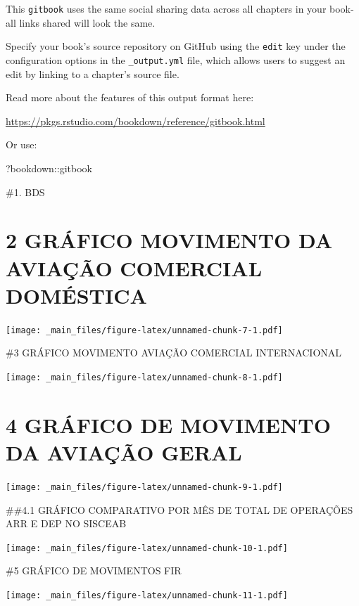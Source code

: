 \documentclass[
]{book}
\newenvironment{Shaded}{\begin{snugshade}}{\end{snugshade}}
\newcommand{\NormalTok}[1]{#1}
\newcommand{\SpecialCharTok}[1]{\textcolor[rgb]{0.00,0.00,0.00}{#1}}
\theoremstyle{definition}
\theoremstyle{definition}
\theoremstyle{definition}
\theoremstyle{definition}
\theoremstyle{remark}
\begin{document}
This \texttt{gitbook} uses the same social sharing data across all chapters in your book- all links shared will look the same.

Specify your book's source repository on GitHub using the \texttt{edit} key under the configuration options in the \texttt{\_output.yml} file, which allows users to suggest an edit by linking to a chapter's source file.

Read more about the features of this output format here:

\url{https://pkgs.rstudio.com/bookdown/reference/gitbook.html}

Or use:

\begin{Shaded}
\begin{Highlighting}[]
\NormalTok{?bookdown}\SpecialCharTok{::}\NormalTok{gitbook}
\end{Highlighting}
\end{Shaded}

\#1. BDS

\hypertarget{gruxe1fico-movimento-da-aviauxe7uxe3o-comercial-domuxe9stica}{%
\chapter{2 GRÁFICO MOVIMENTO DA AVIAÇÃO COMERCIAL DOMÉSTICA}\label{gruxe1fico-movimento-da-aviauxe7uxe3o-comercial-domuxe9stica}}

\texttt{[image: \_main\_files/figure-latex/unnamed-chunk-7-1.pdf]}

\#3 GRÁFICO MOVIMENTO AVIAÇÃO COMERCIAL INTERNACIONAL

\texttt{[image: \_main\_files/figure-latex/unnamed-chunk-8-1.pdf]}

\hypertarget{gruxe1fico-de-movimento-da-aviauxe7uxe3o-geral}{%
\chapter{4 GRÁFICO DE MOVIMENTO DA AVIAÇÃO GERAL}\label{gruxe1fico-de-movimento-da-aviauxe7uxe3o-geral}}

\texttt{[image: \_main\_files/figure-latex/unnamed-chunk-9-1.pdf]}

\#\#4.1 GRÁFICO COMPARATIVO POR MÊS DE TOTAL DE OPERAÇÕES ARR E DEP NO SISCEAB

\texttt{[image: \_main\_files/figure-latex/unnamed-chunk-10-1.pdf]}

\#5 GRÁFICO DE MOVIMENTOS FIR

\texttt{[image: \_main\_files/figure-latex/unnamed-chunk-11-1.pdf]}
\end{document}
